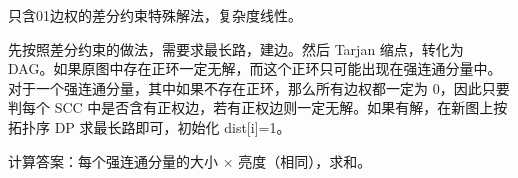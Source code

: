 只含01边权的差分约束特殊解法，复杂度线性。

先按照差分约束的做法，需要求最长路，建边。然后 Tarjan 缩点，转化为 DAG。如果原图中存在正环一定无解，而这个正环只可能出现在强连通分量中。对于一个强连通分量，其中如果不存在正环，那么所有边权都一定为 0，因此只要判每个 SCC 中是否含有正权边，若有正权边则一定无解。如果有解，在新图上按拓扑序 DP 求最长路即可，初始化 dist[i]=1。

计算答案：每个强连通分量的大小 × 亮度（相同），求和。